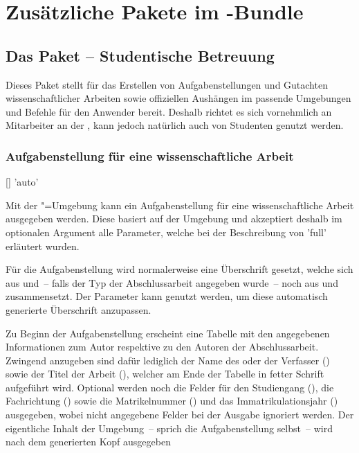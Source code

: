 \chapter{Zusätzliche Pakete im \TUDScript-Bundle}
%
%
\section{Das Paket  -- Studentische Betreuung}
\begin{Bundle*}{}
%
Dieses Paket stellt für das Erstellen von Aufgabenstellungen und Gutachten 
wissenschaftlicher Arbeiten sowie offiziellen Aushängen im \CD passende 
Umgebungen und Befehle für den Anwender bereit. Deshalb richtet es sich 
vornehmlich an Mitarbeiter an der \TnUD, kann jedoch natürlich auch von 
Studenten genutzt werden.


\subsection{Aufgabenstellung für eine wissenschaftliche Arbeit}
%
%
\begin{Declaration}{[]}{%
  'auto'%
}
\begin{Declaration}{}
\printdeclarationlist%
%
Mit der "=Umgebung kann ein Aufgabenstellung für eine 
wissenschaftliche Arbeit ausgegeben werden. Diese basiert auf der Umgebung 
 und akzeptiert deshalb im optionalen Argument alle 
Parameter, welche bei der Beschreibung von 'full' 
erläutert wurden.

Für die Aufgabenstellung wird normalerweise eine Überschrift gesetzt, welche 
sich aus  und~-- falls der Typ der Abschlussarbeit angegeben 
wurde~-- noch aus  und  zusammensetzt. Der 
Parameter  kann genutzt werden, um diese 
automatisch generierte Überschrift anzupassen.

Zu Beginn der Aufgabenstellung erscheint eine Tabelle mit den angegebenen 
Informationen zum Autor respektive zu den Autoren der Abschlussarbeit. Zwingend 
anzugeben sind dafür lediglich der Name des oder der Verfasser () 
sowie der Titel der Arbeit (), welcher am Ende der Tabelle in 
fetter Schrift aufgeführt wird. Optional werden noch die Felder für den 
Studiengang (), die Fachrichtung () sowie die 
Matrikelnummer () und das Immatrikulationsjahr 
() ausgegeben, wobei nicht angegebene Felder bei der 
Ausgabe ignoriert werden. Der eigentliche Inhalt der Umgebung~-- sprich die 
Aufgabenstellung selbst~-- wird nach dem generierten Kopf ausgegeben


\end{Declaration}
\end{Declaration}
\end{Bundle*}
